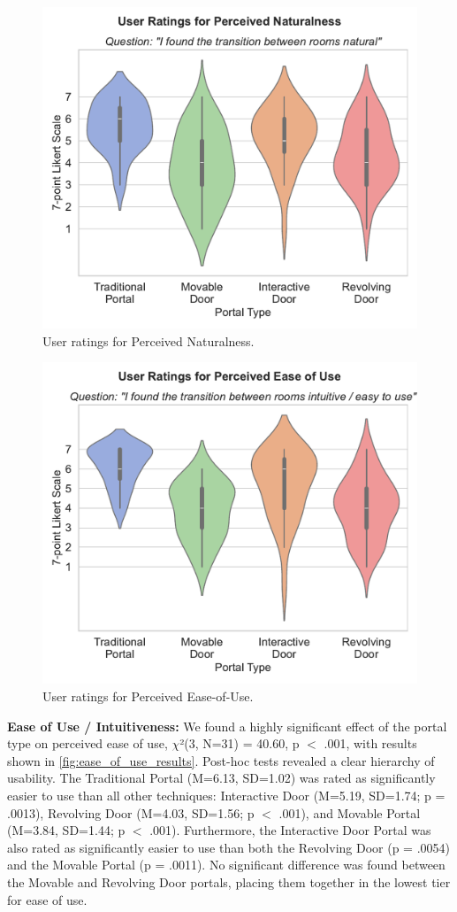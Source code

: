 \begin{figure}[t]
\centering
\includegraphics[width=.6\linewidth]{NOVAthesisFiles/Images/graphs/naturalness_violin_plot.pdf}
\caption{User ratings for Perceived Naturalness.}
\label{fig:naturalness_results}
\end{figure}

\begin{figure}[t]
\centering
\includegraphics[width=.6\linewidth]{NOVAthesisFiles/Images/graphs/ease_of_use_violin_plot.pdf}
\caption{User ratings for Perceived Ease-of-Use.}
\label{fig:ease_of_use_results}
\end{figure}

\textbf{Ease of Use / Intuitiveness:} We found a highly significant effect of the portal type on perceived ease of use, 
$\chi$²(3, N=31) = 40.60, p $<$ .001, with results shown in \autoref{fig:ease_of_use_results}. Post-hoc tests revealed a 
clear hierarchy of usability. The Traditional Portal (M=6.13, SD=1.02) was rated as significantly easier to use than all 
other techniques: Interactive Door (M=5.19, SD=1.74; p = .0013), Revolving Door (M=4.03, SD=1.56; p $<$ .001), and 
Movable Portal (M=3.84, SD=1.44; p $<$ .001). Furthermore, the Interactive Door Portal was also rated as significantly easier 
to use than both the Revolving Door (p = .0054) and the Movable Portal (p = .0011). No significant difference was found between 
the Movable and Revolving Door portals, placing them together in the lowest tier for ease of use.



